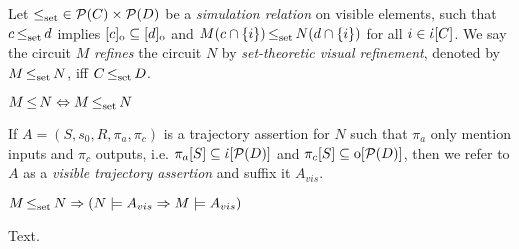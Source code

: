  Let $\operatorname{\operatorname{\leq}_{\textrm{set}}} \in \mathcal{P}(C) \times \mathcal{P}(D)$ be a \textit{simulation relation} on visible elements, such that $c \operatorname{\operatorname{\leq}_{\textrm{set}}} d$ implies $[c]_{\mathrm{o}} \subseteq [d]_{\mathrm{o}}$ and $M(c \cap \{ i \}) \operatorname{\operatorname{\leq}_{\textrm{set}}} N(d \cap \{ i \})$ for all $i \in \dot{\iota}[C]$. We say the circuit $M$ \textit{refines} the circuit $N$ by \textit{set-theoretic visual refinement}, denoted by $M \operatorname{\operatorname{\leq}_{\textrm{set}}} N$, iff $C \operatorname{\operatorname{\leq}_{\textrm{set}}} D$. 

\begin{theorem} \label{thm:set-equals-sim}
$M \operatorname{\leq} N \Leftrightarrow M \operatorname{\operatorname{\leq}_{\textrm{set}}} N$
\end{theorem}

If $A = (S,s_{0},R,\pi_{a},\pi_{c})$ is a trajectory assertion for $N$ such that $\pi_{a}$ only mention inputs and $\pi_{c}$ outputs, i.e. $\pi_{a}[S] \subseteq \dot{\iota}[\mathcal{P}(D)]$ and $\pi_{c}[S] \subseteq \mathrm{o}[\mathcal{P}(D)]$, then we refer to $A$ as a \textit{visible trajectory assertion} and suffix it $A_{vis}$.

\begin{theorem} \label{thm:sim-refines-trans}
$M \operatorname{\operatorname{\leq}_{\textrm{set}}} N \Rightarrow (N \models A_{vis} \Rightarrow M \models A_{vis})$
\end{theorem}

Text.
